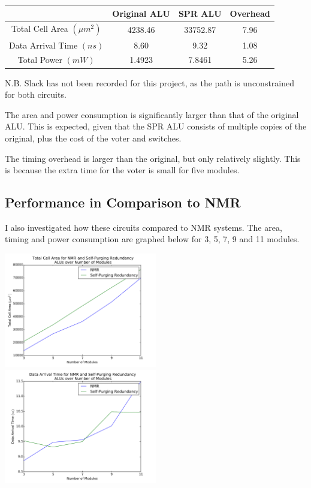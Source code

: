 \documentclass[a4paper,12pt]{article}
\begin{document}
    \begin{tabular}{|c|c|c|c|}
        \hline
        & Original ALU & SPR ALU & Overhead \\ \hline
        Total Cell Area $(\mu m^2)$ & 4238.46 & 33752.87 & 7.96 \\ \hline
        Data Arrival Time $(ns)$ & 8.60 & 9.32 & 1.08 \\ \hline
        Total Power $(mW)$ & 1.4923 & 7.8461 & 5.26 \\ \hline
    \end{tabular}

    N.B. Slack has not been recorded for this project, as the path is unconstrained for both circuits.

    The area and power consumption is significantly larger than that of the original ALU. This is expected, given that the SPR ALU consists of multiple copies of the original, plus the cost of the voter and switches.

    The timing overhead is larger than the original, but only relatively slightly. This is because the extra time for the voter is small for five modules.

    \subsection{Performance in Comparison to NMR}
    I also investigated how these circuits compared to NMR systems. The area, timing and power consumption are graphed below for 3, 5, 7, 9 and 11 modules.

    \includegraphics[width=0.5\textwidth]{area_nmr}
    \includegraphics[width=0.5\textwidth]{time_nmr}
\end{document}
